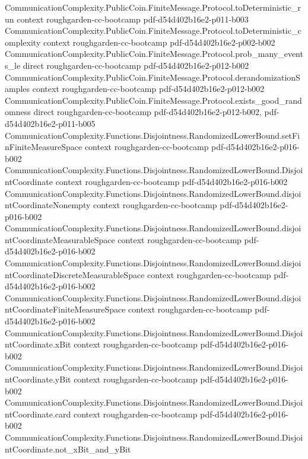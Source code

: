 \begin{theorem}
\proofstep
  {CommunicationComplexity.PublicCoin.FiniteMessage.Protocol.toDeterministic_run}
  {context}
  {roughgarden-cc-bootcamp}
  {pdf-d54d402b16e2-p011-b003}
\proofstep
  {CommunicationComplexity.PublicCoin.FiniteMessage.Protocol.toDeterministic_complexity}
  {context}
  {roughgarden-cc-bootcamp}
  {pdf-d54d402b16e2-p002-b002}
\proofstep
  {CommunicationComplexity.PublicCoin.FiniteMessage.Protocol.prob_many_events_le}
  {direct}
  {roughgarden-cc-bootcamp}
  {pdf-d54d402b16e2-p012-b002}
\proofstep
  {CommunicationComplexity.PublicCoin.FiniteMessage.Protocol.derandomizationSamples}
  {context}
  {roughgarden-cc-bootcamp}
  {pdf-d54d402b16e2-p012-b002}
\proofstep
  {CommunicationComplexity.PublicCoin.FiniteMessage.Protocol.exists_good_randomness}
  {direct}
  {roughgarden-cc-bootcamp}
  {pdf-d54d402b16e2-p012-b002,
    pdf-d54d402b16e2-p011-b005}
\proofstep
  {CommunicationComplexity.Functions.Disjointness.RandomizedLowerBound.setFinFiniteMeasureSpace}
  {context}
  {roughgarden-cc-bootcamp}
  {pdf-d54d402b16e2-p016-b002}
\proofstep
  {CommunicationComplexity.Functions.Disjointness.RandomizedLowerBound.DisjointCoordinate}
  {context}
  {roughgarden-cc-bootcamp}
  {pdf-d54d402b16e2-p016-b002}
\proofstep
  {CommunicationComplexity.Functions.Disjointness.RandomizedLowerBound.disjointCoordinateNonempty}
  {context}
  {roughgarden-cc-bootcamp}
  {pdf-d54d402b16e2-p016-b002}
\proofstep
  {CommunicationComplexity.Functions.Disjointness.RandomizedLowerBound.disjointCoordinateMeasurableSpace}
  {context}
  {roughgarden-cc-bootcamp}
  {pdf-d54d402b16e2-p016-b002}
\proofstep
  {CommunicationComplexity.Functions.Disjointness.RandomizedLowerBound.disjointCoordinateDiscreteMeasurableSpace}
  {context}
  {roughgarden-cc-bootcamp}
  {pdf-d54d402b16e2-p016-b002}
\proofstep
  {CommunicationComplexity.Functions.Disjointness.RandomizedLowerBound.disjointCoordinateFiniteMeasureSpace}
  {context}
  {roughgarden-cc-bootcamp}
  {pdf-d54d402b16e2-p016-b002}
\proofstep
  {CommunicationComplexity.Functions.Disjointness.RandomizedLowerBound.DisjointCoordinate.xBit}
  {context}
  {roughgarden-cc-bootcamp}
  {pdf-d54d402b16e2-p016-b002}
\proofstep
  {CommunicationComplexity.Functions.Disjointness.RandomizedLowerBound.DisjointCoordinate.yBit}
  {context}
  {roughgarden-cc-bootcamp}
  {pdf-d54d402b16e2-p016-b002}
\proofstep
  {CommunicationComplexity.Functions.Disjointness.RandomizedLowerBound.DisjointCoordinate.card}
  {context}
  {roughgarden-cc-bootcamp}
  {pdf-d54d402b16e2-p016-b002}
\proofstep
  {CommunicationComplexity.Functions.Disjointness.RandomizedLowerBound.DisjointCoordinate.not_xBit_and_yBit}

\end{theorem}

